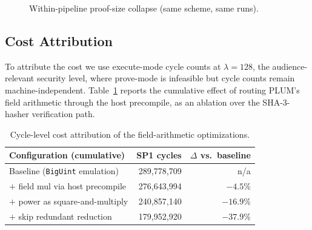 \begin{figure}[H]
\centering
{}
\caption{Within-pipeline proof-size collapse (same scheme, same runs).}
\label{fig:proof-collapse}
\end{figure}

\subsection{Cost Attribution}\label{ssec:attribution}
To attribute the cost we use execute-mode cycle counts at $\lambda=128$, the audience-relevant security level, where prove-mode is infeasible but cycle counts remain machine-independent. Table~\ref{tab:ablation} reports the cumulative effect of routing PLUM's field arithmetic through the host precompile, as an ablation over the SHA-3-hasher verification path.

\begin{table}[H]
\centering
\small
\begin{tabular}{lrr}
\toprule
Configuration (cumulative) & SP1 cycles & $\Delta$ vs.\ baseline \\
\midrule
Baseline (\texttt{BigUint} emulation)        & 289{,}778{,}709 & n/a \\
$+$ field mul via host precompile            & 276{,}643{,}994 & $-4.5\%$ \\
$+$ power as square-and-multiply             & 240{,}857{,}140 & $-16.9\%$ \\
$+$ skip redundant reduction                 & 179{,}952{,}920 & $-37.9\%$ \\
\bottomrule
\end{tabular}
\caption{Cycle-level cost attribution of the field-arithmetic optimizations.}
\label{tab:ablation}
\end{table}

